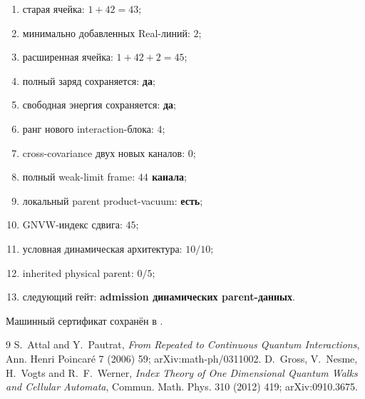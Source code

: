 \begin{protocol}\begin{enumerate}
\item старая ячейка: \textbf{$1+42=43$};
\item минимально добавленных Real-линий: \textbf{$2$};
\item расширенная ячейка: \textbf{$1+42+2=45$};
\item полный заряд сохраняется: \textbf{да};
\item свободная энергия сохраняется: \textbf{да};
\item ранг нового interaction-блока: \textbf{$4$};
\item cross-covariance двух новых каналов: \textbf{$0$};
\item полный weak-limit frame: \textbf{$44$ канала};
\item локальный parent product-vacuum: \textbf{есть};
\item GNVW-индекс сдвига: \textbf{$45$};
\item условная динамическая архитектура: \textbf{$10/10$};
\item inherited physical parent: \textbf{$0/5$};
\item следующий гейт: \textbf{admission динамических parent-данных}.
\end{enumerate}\end{protocol}

Машинный сертификат сохранён в
.

\begin{thebibliography}{9}
 S.~Attal and Y.~Pautrat,
\emph{From Repeated to Continuous Quantum Interactions},
Ann. Henri Poincar\'e 7 (2006) 59; arXiv:math-ph/0311002.
 D.~Gross, V.~Nesme, H.~Vogts and
R.~F.~Werner, \emph{Index Theory of One Dimensional Quantum Walks and
Cellular Automata}, Commun. Math. Phys. 310 (2012) 419;
arXiv:0910.3675.
\end{thebibliography}